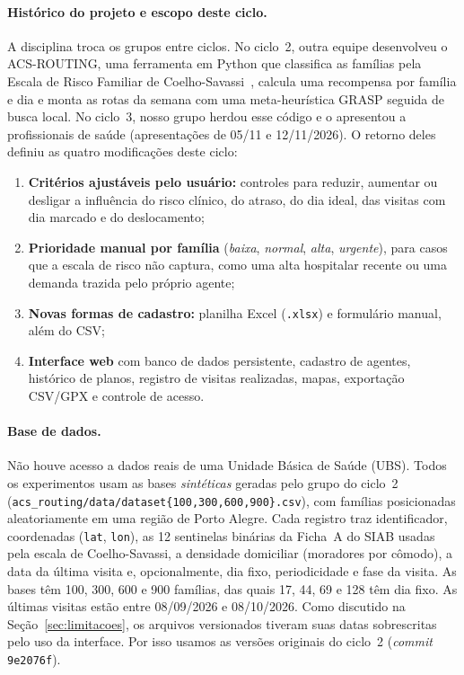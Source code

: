 \documentclass[11pt,a4paper]{article}
\begin{document}
\paragraph{Histórico do projeto e escopo deste ciclo.} A disciplina troca os grupos entre ciclos. No ciclo~2, outra equipe desenvolveu o ACS-ROUTING, uma ferramenta em Python que classifica as famílias pela Escala de Risco Familiar de Coelho-Savassi~\cite{coelho2004}, calcula uma recompensa por família e dia e monta as rotas da semana com uma meta-heurística GRASP seguida de busca local. No ciclo~3, nosso grupo herdou esse código e o apresentou a profissionais de saúde (apresentações de 05/11 e 12/11/2026). O retorno deles definiu as quatro modificações deste ciclo:
\begin{enumerate}
    \item \textbf{Critérios ajustáveis pelo usuário:} controles para reduzir, aumentar ou desligar a influência do risco clínico, do atraso, do dia ideal, das visitas com dia marcado e do deslocamento;
    \item \textbf{Prioridade manual por família} (\emph{baixa}, \emph{normal}, \emph{alta}, \emph{urgente}), para casos que a escala de risco não captura, como uma alta hospitalar recente ou uma demanda trazida pelo próprio agente;
    \item \textbf{Novas formas de cadastro:} planilha Excel (\texttt{.xlsx}) e formulário manual, além do CSV;
    \item \textbf{Interface web} com banco de dados persistente, cadastro de agentes, histórico de planos, registro de visitas realizadas, mapas, exportação CSV/GPX e controle de acesso.
\end{enumerate}

\paragraph{Base de dados.} Não houve acesso a dados reais de uma Unidade Básica de Saúde (UBS). Todos os experimentos usam as bases \emph{sintéticas} geradas pelo grupo do ciclo~2 (\nolinkurl{acs_routing/data/dataset{100,300,600,900}.csv}), com famílias posicionadas aleatoriamente em uma região de Porto Alegre. Cada registro traz identificador, coordenadas (\texttt{lat}, \texttt{lon}), as 12 sentinelas binárias da Ficha~A do SIAB usadas pela escala de Coelho-Savassi, a densidade domiciliar (moradores por cômodo), a data da última visita e, opcionalmente, dia fixo, periodicidade e fase da visita. As bases têm 100, 300, 600 e 900 famílias, das quais 17, 44, 69 e 128 têm dia fixo. As últimas visitas estão entre 08/09/2026 e 08/10/2026. Como discutido na Seção~\ref{sec:limitacoes}, os arquivos versionados tiveram suas datas sobrescritas pelo uso da interface. Por isso usamos as versões originais do ciclo~2 (\emph{commit} \texttt{9e2076f}).
\end{document}
